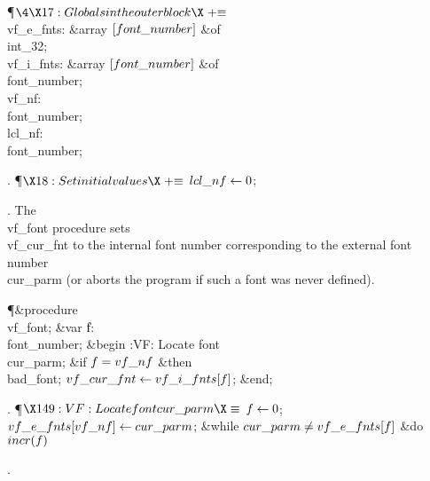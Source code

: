 \Y\P$\4\X17:Globals in the outer block\X\mathrel{+}\S$\6
\4\\{vf\_e\_fnts}: \&{array} $[\\{font\_number}]$ \1\&{of}\5
\\{int\_32};\2\6
\4\\{vf\_i\_fnts}: \&{array} $[\\{font\_number}]$ \1\&{of}\5
\\{font\_number};\2\6
\4\\{vf\_nf}: \\{font\_number};\6
\4\\{lcl\_nf}: \\{font\_number};\par
\fi

. \P$\X18:Set initial values\X\mathrel{+}\S$\6
$\\{lcl\_nf}\K0$;\par
\fi

. The \\{vf\_font} procedure sets \\{vf\_cur\_fnt} to the internal font
number
corresponding to the external font number \\{cur\_parm} (or aborts the
program if such a font was never defined).

\Y\P\4\&{procedure}\1\  \\{vf\_font};\6
\4\&{var} \|f: \\{font\_number};\2\6
\&{begin} :VF: Locate font \\{cur\_parm}\X;\6
\&{if} $\|f=\\{vf\_nf}$ \1\&{then}\5
\\{bad\_font};\2\6
$\\{vf\_cur\_fnt}\K\\{vf\_i\_fnts}[\|f]$;\6
\&{end};\par
\fi

. \P$\X149:VF: Locate font \\{cur\_parm}\X\S$\6
$\|f\K0$;\5
$\\{vf\_e\_fnts}[\\{vf\_nf}]\K\\{cur\_parm}$;\6
\&{while} $\\{cur\_parm}\I\\{vf\_e\_fnts}[\|f]$ \1\&{do}\5
$\\{incr}(\|f)$\2\par
{}.\fi

